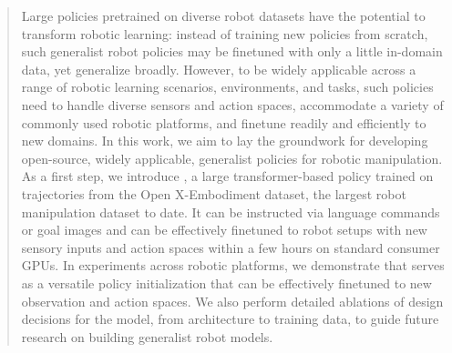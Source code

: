 \begin{abstract}

Large policies pretrained on diverse robot datasets have the potential to transform robotic learning: instead of training new policies from scratch, such generalist robot policies may be finetuned with only a little in-domain data, yet generalize broadly.
However, to be widely applicable across a range of robotic learning scenarios, environments, and tasks, such policies need to handle diverse sensors and action spaces, accommodate a variety of commonly used robotic platforms, and finetune readily and efficiently to new domains.
In this work, we aim to lay the groundwork for developing open-source, widely applicable, generalist policies for robotic manipulation. As a first step, we introduce \methodfancy, a large transformer-based policy trained on \ntrajs{} trajectories from the Open X-Embodiment dataset, the largest robot manipulation dataset to date.
It can be instructed via language commands or goal images and can be effectively finetuned to robot setups with new sensory inputs and action spaces within a few hours on standard consumer GPUs. 
In experiments across \nsetups{} robotic platforms, we demonstrate that \method{} serves as a versatile policy initialization that can be effectively finetuned to new observation and action spaces. We also perform detailed ablations of design decisions for the \method{} model, from architecture to training data, to guide future research on building generalist robot models.




\end{abstract}
